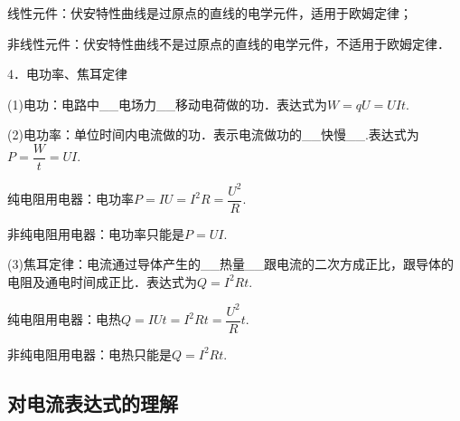 \documentclass[cn,10.5pt,chinese,mac,chinesefont=founder]{elegantbook}
\begin{document}
线性元件：伏安特性曲线是过原点的直线的电学元件，适用于欧姆定律；

非线性元件：伏安特性曲线不是过原点的直线的电学元件，不适用于欧姆定律．

4．电功率、焦耳定律

(1)电功：电路中\_\_电场力\_\_移动电荷做的功．表达式为$W=q U=U I t$.

(2)电功率：单位时间内电流做的功．表示电流做功的\_\_快慢\_\_.表达式为$P=\dfrac{W}{t}=UI$.

纯电阻用电器：电功率$P=I U=I^{2} R=\dfrac{U^{2}}{R}$.

非纯电阻用电器：电功率只能是$P=UI$.

(3)焦耳定律：电流通过导体产生的\_\_热量\_\_跟电流的二次方成正比，跟导体的电阻及通电时间成正比．表达式为$Q=I^2Rt$.

纯电阻用电器：电热$Q=I Ut=I^{2} Rt=\dfrac{U^{2}}{R}t$.

非纯电阻用电器：电热只能是$Q=I^2Rt$.


\newpage
\subsection{对电流表达式的理解}
\end{document}
